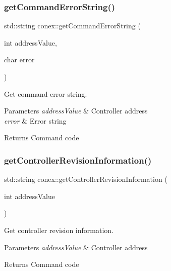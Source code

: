 \subsubsection{\texorpdfstring{get\+Command\+Error\+String()}{getCommandErrorString()}}
{\footnotesize\ttfamily std\+::string conex\+::get\+Command\+Error\+String (\begin{DoxyParamCaption}\item[{int}]{address\+Value,  }\item[{char}]{error }\end{DoxyParamCaption})}



Get command error string. 


\begin{DoxyParams}{Parameters}
{\em address\+Value} & Controller address \\
\hline
{\em error} & Error string \\
\hline
\end{DoxyParams}
\begin{DoxyReturn}{Returns}
Command code 
\end{DoxyReturn}
\mbox{\label{namespaceconex_a0eb1fa3646288f0387cb303f0d8f71df}} 
\subsubsection{\texorpdfstring{get\+Controller\+Revision\+Information()}{getControllerRevisionInformation()}}
{\footnotesize\ttfamily std\+::string conex\+::get\+Controller\+Revision\+Information (\begin{DoxyParamCaption}\item[{int}]{address\+Value }\end{DoxyParamCaption})}



Get controller revision information. 


\begin{DoxyParams}{Parameters}
{\em address\+Value} & Controller address \\
\hline
\end{DoxyParams}
\begin{DoxyReturn}{Returns}
Command code 
\end{DoxyReturn}
\mbox{\label{namespaceconex_a50aafea583b1e9883f5c9da70f84e572}} 
